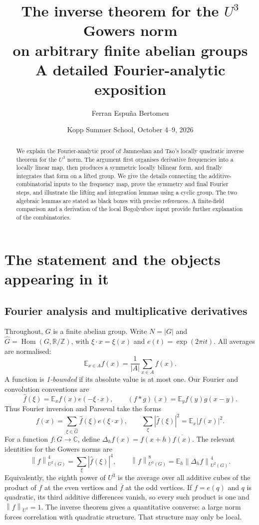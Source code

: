 \documentclass[11pt,a4paper]{article}
\title{The inverse theorem for the $U^3$ Gowers norm\\on arbitrary finite abelian groups\\[3mm]\large A detailed Fourier-analytic exposition}
\author{Ferran Espu\~na Bertomeu}
\date{Kopp Summer School, October 4--9, 2026}
\newcommand{\E}{\mathbb E}
\newcommand{\T}{\mathbb R/\mathbb Z}
\newcommand{\C}{\mathbb C}
\newcommand{\Gh}{\widehat G}
\newcommand{\norm}[1]{\left\|#1\right\|}
\theoremstyle{definition}
\numberwithin{equation}{section}
\begin{document}
\maketitle
\begin{abstract}
We explain the Fourier-analytic proof of Jamneshan and Tao's locally
quadratic inverse theorem for the $U^3$ norm. The argument first organises
derivative frequencies into a locally linear map, then produces a
symmetric locally bilinear form, and finally integrates that form on a
lifted group. We give the details connecting the additive-combinatorial
inputs to the frequency map, prove the symmetry and final Fourier steps,
and illustrate the lifting and integration lemmas using a cyclic group.
The two algebraic lemmas are stated as black boxes with precise references.
A finite-field comparison and a derivation of the local Bogolyubov input
provide further explanation of the combinatorics.
\end{abstract}
\tableofcontents
\newpage

\section{The statement and the objects appearing in it}
\subsection{Fourier analysis and multiplicative derivatives}
Throughout, $G$ is a finite abelian group. Write $N=|G|$ and
$\Gh=\operatorname{Hom}(G,\T)$, with $\xi\cdot x=\xi(x)$ and
$e(t)=\exp(2\pi it)$. All averages are normalised:
\[
\E_{x\in A}f(x)=\frac1{|A|}\sum_{x\in A}f(x).
\]
A function is \emph{1-bounded} if its absolute value is at most one.
Our Fourier and convolution conventions are
\[
\widehat f(\xi)=\E_xf(x)e(-\xi\cdot x),\qquad
(f*g)(x)=\E_yf(y)g(x-y).
\]
Thus Fourier inversion and Parseval take the forms
\[
f(x)=\sum_{\xi\in\Gh}\widehat f(\xi)e(\xi\cdot x),\qquad
\sum_\xi|\widehat f(\xi)|^2=\E_x|f(x)|^2.
\]
For a function $f:G\to\C$, define
$\Delta_hf(x)=f(x+h)\overline{f(x)}$. The relevant identities for the
Gowers norms are
\begin{equation}\label{eq:derivative}
\norm{f}_{U^2(G)}^4=\sum_\xi|\widehat f(\xi)|^4,
\qquad
\norm{f}_{U^3(G)}^8=\E_h\norm{\Delta_hf}_{U^2(G)}^4.
\end{equation}
Equivalently, the eighth power of $U^3$ is the average over all additive
cubes of the product of $f$ at the even vertices and $\overline f$ at the
odd vertices. If $f=e(q)$ and $q$ is quadratic, its third additive
differences vanish, so every such product is one and $\norm f_{U^3}=1$.
The inverse theorem gives a quantitative converse: a large norm forces
correlation with quadratic structure. That structure may only be local.
\end{document}
